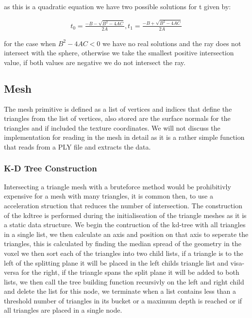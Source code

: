 as this is a quadratic equation we have two possible solutions for t given by:

\begin{align*}
t_0 = \frac{- B - \sqrt{B^2 - 4AC}}{2A}
,
t_1 = \frac{- B + \sqrt{B^2 - 4AC}}{2A}
\end{align*}

for the case when $B^2 - 4AC < 0$ we have no real solutions and the ray does not intersect with the sphere, otherwise we
take the smallest positive intersection value, if both values are negative we do not intersect the ray.

\subsection{Mesh}
The mesh primitive is defined as a list of vertices and indices that define the triangles from the list of vertices, also
stored are the surface normals for the triangles and if included the texture coordinates. We will not discuss the implementation
for reading in the mesh in detail as it is a rather simple function that reads from a PLY file and extracts the data.


\subsubsection{K-D Tree Construction}
Intersecting a triangle mesh with a bruteforce method would be prohibitivly expensive for a mesh with many triangles, it
is common then, to use a acceleration struction that reduces the number of intersection. The
construction of the kdtree is performed during the initialiseation of the triangle meshes as it is a static data structure.
We begin the contruction of the kd-tree with all
triangles in a single list, we then calculate an axis and position on that axis to seperate the triangles, this is calculated
by finding the median spread of the geometry in the voxel we then sort each of the triangles into two child lists, if a triangle is
to the left of the splitting plane it will be placed in the left childs triangle list and visa-versa for the right, if the
triangle spans the split plane it will be added to both lists, we then call the tree building function recursivly on the
left and right child and delete the list for this node, we terminate when a list contains less than a threshold number
of triangles in its bucket or a maximum depth is reached or if all triangles are placed in a single node.

